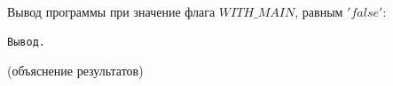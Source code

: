 Вывод программы при значение флага $WITH\_MAIN$, равным $'false'$:
\begin{verbatim}
Вывод.
\end{verbatim}
(объяснение результатов)





% 
